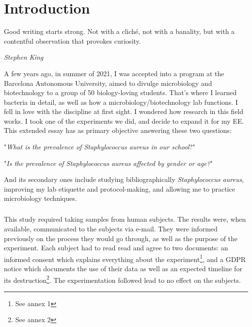 \chapter{Introduction}
\epigraph{Good writing starts strong. Not with a cliché, not with a banality, but with a contentful observation that provokes curiosity.}{\textit{Stephen King}}
A few years ago, in summer of 2021, I was accepted into a program at the Barcelona Autonomous University, aimed to divulge microbiology and biotechnology to a group of 50 biology-loving students. That's where I learned bacteria in detail, as well as how a microbiology/biotechnology lab functions. I fell in love with the discipline at first sight. I wondered how research in this field works. I took one of the experiments we did, and decide to expand it for my EE.\newline %
This extended essay has as primary objective answering these two questions:
\begin{center}"\emph{What is the prevalence of \emph{Staphylococcus aureus} in our school}?"\end{center}
\begin{center}"\emph{Is the prevalence of \emph{Staphylococcus aureus} affected by gender or age?}"\end{center}
And its secondary ones include studying bibliographically \emph{Staphylococcus aureus}, improving my lab etiquette and protocol-making, and allowing me to practice microbiology techniques.
\paragraph{}This study required taking samples from  human subjects. The results were, when available, communicated to the subjects via e-mail. They were informed previously on the process they would go through, as well as the purpose of the experiment. Each subject had to read read and agree to two documents: an informed consent which explains everything about the experiment\footnote{See annex 1}, and a GDPR notice which documents the use of their data as well as an expected timeline for its destruction\cite{WhatGDPREU2018}\footnote{See annex 2}. The experimentation followed lead to no effect on the subjects.
